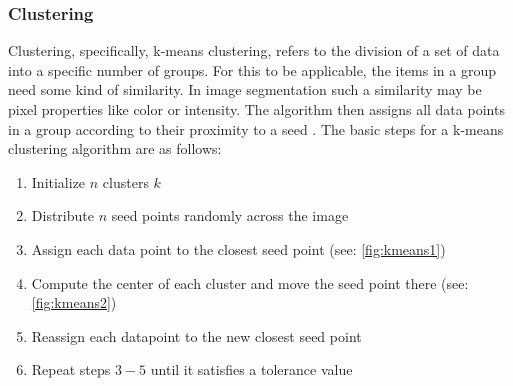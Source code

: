 \subsubsection{Clustering}
Clustering, specifically, k-means clustering, refers to the division of a set of data into
a specific number of groups.
For this to be applicable, the items in a group need some kind of similarity.
In image segmentation such a similarity may be pixel properties like color or intensity.
The algorithm then assigns all data points in a group according to their proximity to a seed \cite{dhanachandraImageSegmentationUsing2015}.
The basic steps for a k-means clustering algorithm are as follows:
\begin{enumerate}
	\item Initialize $n$ clusters $k$
	\item Distribute $n$ seed points randomly across the image
	\item Assign each data point to the closest seed point (see: \cref{fig:kmeans1})
	\item Compute the center of each cluster and move the seed point there (see: \cref{fig:kmeans2})
	\item Reassign each datapoint to the new closest seed point
	\item Repeat steps $3 - 5$ until it satisfies a tolerance value
\end{enumerate}

